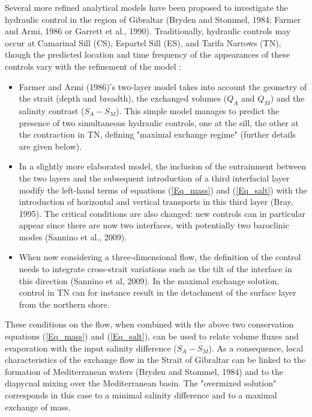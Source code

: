 Several more refined analytical models have been proposed to investigate the hydraulic control in the region of Gibraltar (Bryden and Stommel, 1984; Farmer and Armi, 1986 or Garrett et al., 1990). 
Traditionally, hydraulic controls may occur at Camarinal Sill (CS), Espartel Sill (ES), and Tarifa Narrows (TN), though the predicted location and time frequency of the appearances of these controls vary with the refinement of the model :
\begin{itemize}
\item{Farmer and Armi (1986)'s two-layer model takes into account the geometry of the strait (depth and breadth), the exchanged volumes ($Q_A$ and $Q_M$) and the salinity contrast ($S_A -S_M$). This simple model manages to predict the presence of two simultaneous hydraulic controls, one at the sill, the other at the contraction in TN, defining "maximal exchange regime"  (further details are given below). }

\item{In a slightly more elaborated model, the inclusion of the entrainment between the two layers and the subsequent introduction of a third interfacial layer modify the left-hand terms of equations (\ref{Eq_mass}) and (\ref{Eq_salt}) with the introduction of horizontal and vertical transports in this third layer (Bray, 1995). The critical conditions are also changed: new controls can in particular appear since there are now two interfaces, with potentially two baroclinic modes (Sannino et al., 2009).}

\item{ When now considering a three-dimensional flow, the definition of the control needs to integrate cross-strait variations such as the tilt of the interface in this direction (Sannino et al, 2009). In the maximal exchange solution, control in TN can for instance result in the detachment of the surface layer from the northern shore.}
\end{itemize}

These conditions on the flow, when combined with the above two conservation equations (\ref{Eq_mass}) and (\ref{Eq_salt}), can be used to relate volume fluxes and evaporation with the input salinity difference ($S_A-S_M$). As a consequence, local characteristics of the exchange flow in the Strait of Gibraltar can be linked to the formation of Mediterranean waters (Bryden and Stommel, 1984) and to the diapycnal mixing over the Mediterranean basin. The "overmixed solution" corresponds in this case to a minimal salinity difference and to a maximal exchange of mass.

